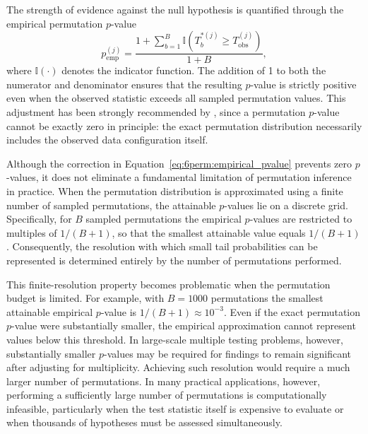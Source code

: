 The strength of evidence against the null hypothesis is quantified through the empirical permutation $p$-value
\begin{equation}
\label{eq:6perm:empirical_pvalue}
p_{\mathrm{emp}}^{(j)} =
\frac{1 + \sum_{b=1}^{B}\mathbb{I}\!\left(T_b^{*(j)} \ge T_{\mathrm{obs}}^{(j)}\right)}{1 + B},
\end{equation}
where $\mathbb{I}(\cdot)$ denotes the indicator function. 
The addition of 1 to both the numerator and denominator ensures that the resulting $p$-value is strictly positive even when the observed statistic exceeds all sampled permutation values. 
This adjustment has been strongly recommended by \citet{phipson2010permutation}, since a permutation $p$-value cannot be exactly zero in principle: the exact permutation distribution necessarily includes the observed data configuration itself.

Although the correction in Equation~\eqref{eq:6perm:empirical_pvalue} prevents zero $p$-values, it does not eliminate a fundamental limitation of permutation inference in practice. 
When the permutation distribution is approximated using a finite number of sampled permutations, the attainable $p$-values lie on a discrete grid. 
Specifically, for $B$ sampled permutations the empirical $p$-values are restricted to multiples of $1/(B+1)$, so that the smallest attainable value equals $1/(B+1)$. 
Consequently, the resolution with which small tail probabilities can be represented is determined entirely by the number of permutations performed.

This finite-resolution property becomes problematic when the permutation budget is limited. 
For example, with $B=1000$ permutations the smallest attainable empirical $p$-value is $1/(B+1) \approx 10^{-3}$. Even if the exact permutation $p$-value were substantially smaller, the empirical approximation cannot represent values below this threshold. 
In large-scale multiple testing problems, however, substantially smaller $p$-values may be required for findings to remain significant after adjusting for multiplicity. 
Achieving such resolution would require a much larger number of permutations. 
In many practical applications, however, performing a sufficiently large number of permutations is computationally infeasible, particularly when the test statistic itself is expensive to evaluate or when thousands of hypotheses must be assessed simultaneously.


